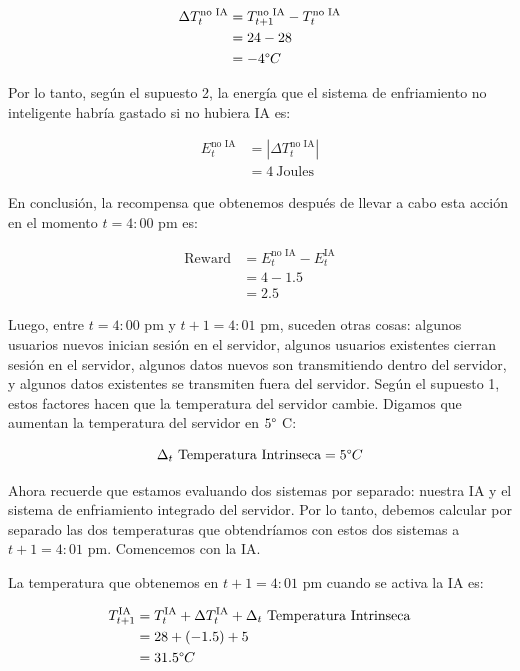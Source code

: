 \documentclass[]{book}
\begin{document}
\begin{align*}
    \Delta T_t^{\textrm{no IA}}
    & = T_{t+1}^{\textrm{no IA}} - T_t^{\textrm{no IA}} \\
    & = 24 - 28 \\
    & = -4 \degree C
\end{align*}

Por lo tanto, según el supuesto 2, la energía que el sistema de enfriamiento no inteligente habría gastado si no hubiera IA es:

\begin{align*}
    E_t^{\textrm{no IA}}
    & = |\Delta T_t^{\textrm{no IA}}| \\
    & = 4 \ \textrm{Joules}
\end{align*}

En conclusión, la recompensa que obtenemos después de llevar a cabo esta acción en el momento \(t = 4: 00\) pm es:

\begin{align*}
    \textrm{Reward}
    & = E_t^{\textrm{no IA}} - E_t^{\textrm{IA}} \\
    & = 4 - 1.5 \\
    & = 2.5
\end{align*}

Luego, entre \(t = 4: 00\) pm y \(t + 1 = 4: 01\) pm, suceden otras cosas: algunos usuarios nuevos inician sesión en el servidor, algunos usuarios existentes cierran sesión en el servidor, algunos datos nuevos son transmitiendo dentro del servidor, y algunos datos existentes se transmiten fuera del servidor. Según el supuesto 1, estos factores hacen que la temperatura del servidor cambie. Digamos que aumentan la temperatura del servidor en \(5 \degree\) C:

\[\Delta_t \ \textrm{Temperatura Intrinseca} = 5 \degree C\]

Ahora recuerde que estamos evaluando dos sistemas por separado: nuestra IA y el sistema de enfriamiento integrado del servidor. Por lo tanto, debemos calcular por separado las dos temperaturas que obtendríamos con estos dos sistemas a \(t + 1 = 4: 01\) pm. Comencemos con la IA.

La temperatura que obtenemos en \(t + 1 = 4: 01\) pm cuando se activa la IA es:

\begin{align*}
    T_{t+1}^{\textrm{IA}}
    & = T_t^{\textrm{IA}} + \Delta T_t^{\textrm{IA}} + \Delta_t \ \textrm{Temperatura Intrinseca} \\
    & = 28 + (-1.5) + 5 \\
    & = 31.5 \degree C
\end{align*}
\end{document}
